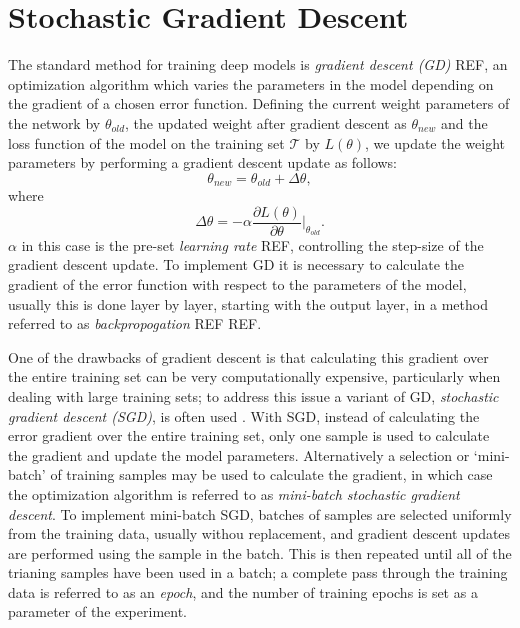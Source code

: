 \section{Stochastic Gradient Descent}
The standard method for training deep models is \textit{gradient descent (GD)} \cite{Witten2011} \cite{Theodoridis2009} REF, an optimization algorithm which varies the parameters in the model depending on the gradient of a chosen error function. Defining the current weight parameters of the network by $\theta_{old}$, the updated weight after gradient descent as $\theta_{new}$ and the loss function of the model on the training set $\mathcal{T}$ by $L(\theta)$, we update the weight parameters by performing a gradient descent update as follows:
\begin{equation}
\theta_{new} = \theta_{old} + \Delta \theta,
\end{equation}
where
\begin{equation}
\Delta \theta = -\alpha \frac{\partial L(\theta)}{\partial\theta} |_{\theta_{old}}.
\end{equation}
$\alpha$ in this case is the pre-set \textit{learning rate} \cite{Witten2011} REF, controlling the step-size of the gradient descent update. To implement GD it is necessary to calculate the gradient of the error function with respect to the parameters of the model, usually this is done layer by layer, starting with the output layer, in a method referred to as \textit{backpropogation} REF REF. 

One of the drawbacks of gradient descent is that calculating this gradient over the entire training set can be very computationally expensive, particularly when dealing with large training sets; to address this issue a variant of GD, \textit{stochastic gradient descent (SGD)}, is often used \cite{shamir2013stochastic}. With SGD, instead of calculating the error gradient over the entire training set, only one sample is used to calculate the gradient and update the model parameters. Alternatively a selection or `mini-batch' of training samples may be used to calculate the gradient, in which case the optimization algorithm is referred to as \textit{mini-batch stochastic gradient descent}. To implement mini-batch SGD, batches of samples are selected uniformly from the training data, usually withou replacement, and gradient descent updates are performed using the sample in the batch. This is then repeated until all of the trianing samples have been used in a batch; a complete pass through the training data is referred to as an \textit{epoch}, and the number of training epochs is set as a parameter of the experiment. 

